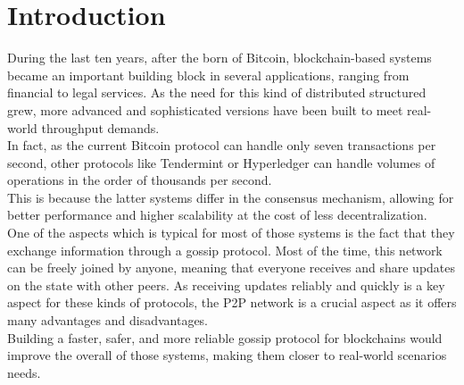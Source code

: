 \documentclass[mscthesis]{usiinfthesis}
\begin{document}
\tableofcontents 
\listoffigures 
\listoftables %

\mainmatter

\chapter{Introduction}
During the last ten years, after the born of Bitcoin\citep{nakamoto2008bitcoin}, blockchain-based systems became an important building block in several applications, ranging from financial to legal services. As the need for this kind of distributed structured grew, more advanced and sophisticated versions have been built to meet real-world throughput demands. \\
In fact, as the current Bitcoin protocol can handle only seven transactions per second, other protocols like Tendermint\citep{kwon2014tendermint} or Hyperledger can handle volumes of operations in the order of thousands per second. \\
This is because the latter systems differ in the consensus mechanism, allowing for better performance and higher scalability at the cost of less decentralization. \\
One of the aspects which is typical for most of those systems is the fact that they exchange information through a gossip protocol. Most of the time, this network can be freely joined by anyone, meaning that everyone receives and share updates on the state with other peers. 
As receiving updates reliably and quickly is a key aspect for these kinds of protocols, the P2P network is a crucial aspect as it offers many advantages and disadvantages. \\
Building a faster, safer, and more reliable gossip protocol for blockchains would improve the overall of those systems, making them closer to real-world scenarios needs.
\end{document}
